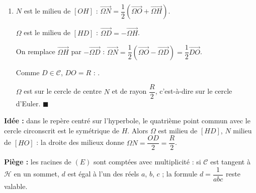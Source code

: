 \begin{enumerate}[itemsep=14pt]
\begin{enumerate}[itemsep=8pt]
    Le point $D\left(d,\dfrac1d\right)=\left(\dfrac1{abc},abc\right)$ est sur $\mathcal H$ et son abscisse est racine de $(E)$ : $D\in\mathcal C$.

    Enfin $D=(-x_H,-y_H)$ : $D$ est le symétrique de $H$ par rapport à $\Omega$.
    \item $N$ est le milieu de $[OH]$ : $\overrightarrow{\Omega N}=\dfrac12\left(\overrightarrow{\Omega O}+\overrightarrow{\Omega H}\right)$.

    $\Omega$ est le milieu de $[HD]$ : $\overrightarrow{\Omega D}=-\overrightarrow{\Omega H}$.

    On remplace $\overrightarrow{\Omega H}$ par $-\overrightarrow{\Omega D}$ : \textbf{$\overrightarrow{\Omega N}=\dfrac12\left(\overrightarrow{\Omega O}-\overrightarrow{\Omega D}\right)=\dfrac12\overrightarrow{DO}$}.

    Comme $D\in\mathcal C$, $DO=R$ : .

    $\Omega$ est sur le cercle de centre $N$ et de rayon $\dfrac R2$, c'est-à-dire sur le cercle d'Euler. $\blacksquare$
  \end{enumerate}
\end{enumerate}

\textbf{Idée :} dans le repère centré sur l'hyperbole, le quatrième point commun avec le cercle circonscrit est le symétrique de $H$. Alors $\Omega$ est milieu de $[HD]$, $N$ milieu de $[HO]$ : la droite des milieux donne $\Omega N=\dfrac{OD}2=\dfrac R2$.

\textbf{Piège :} les racines de $(E)$ sont comptées avec multiplicité : si $\mathcal C$ est tangent à $\mathcal H$ en un sommet, $d$ est égal à l'un des réels $a$, $b$, $c$ ; la formule $d=\dfrac1{abc}$ reste valable.
